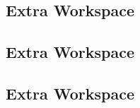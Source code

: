 \documentclass{article}
\theoremstyle{definition}
\begin{document}
\newpage
\subsection*{Extra Workspace}

\newpage
\subsection*{Extra Workspace}

\newpage
\subsection*{Extra Workspace}
\end{document}
